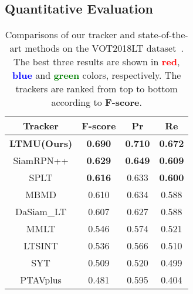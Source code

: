 \documentclass[10pt,twocolumn,letterpaper]{article}
\begin{document}
\subsection{Quantitative Evaluation}
\vspace{-4mm}
\begin{table}[htbp]
\caption{Comparisons of our tracker and  state-of-the-art methods on the VOT2018LT
dataset~\cite{VOT2018report}. The best three results are shown in \textcolor{red}{\textbf{red}},
\textcolor{blue}{\textbf{blue}} and \textcolor{green}{\textbf{green}} colors, respectively.
The trackers are ranked from top to bottom according to \textbf{F-score}.}
\label{tab-vot18lt}
\vspace{-2mm}
\small
\begin{center}
\begin{tabular}{cccc}
\hline
\textbf{Tracker} & \textbf{F-score}                      & \textbf{Pr}                           & \textbf{Re}                           \\ \hline
\textbf{LTMU(Ours)}             & {\color[HTML]{FE0000} \textbf{0.690}} & {\color[HTML]{FE0000} \textbf{0.710}} & {\color[HTML]{FE0000} \textbf{0.672}} \\
SiamRPN++        & {\color[HTML]{3166FF} \textbf{0.629}} & {\color[HTML]{3166FF} \textbf{0.649}} & {\color[HTML]{3166FF} \textbf{0.609}} \\
SPLT             & {\color[HTML]{32CB00} \textbf{0.616}} & 0.633                                 & {\color[HTML]{32CB00} \textbf{0.600}} \\
MBMD              & 0.610                                 & 0.634                                 & 0.588                            \\
DaSiam\_LT       & 0.607                                 & {\color[HTML]{000000} 0.627}          & 0.588       \\
MMLT                & 0.546                                 & 0.574                                 & 0.521                            \\
LTSINT              & 0.536                                 & 0.566                                 & 0.510                            \\
SYT                   & 0.509                                 & 0.520                                 & 0.499                             \\
PTAVplus           & 0.481                                 & 0.595                                 & 0.404                            \\

\end{tabular}
\end{center}
\end{table}
\end{document}
